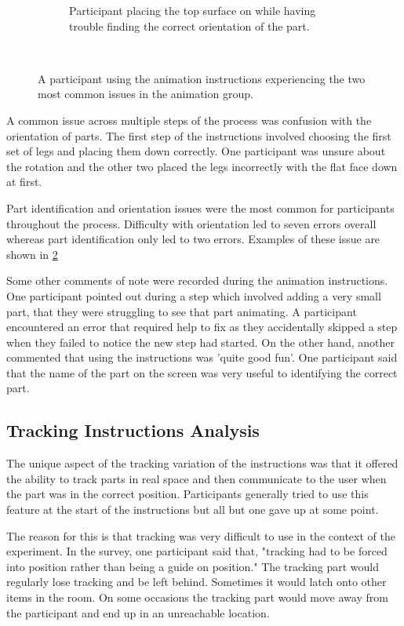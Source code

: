 \documentclass{l4proj}
\begin{document}
\begin{figure}[hbt!]
\begin{subfigure}[b]{0.45\textwidth}
        \caption{Participant placing the top surface on while having trouble finding the correct orientation of the part.}
        \label{fig:expTop}
    \end{subfigure}
    ~ %
    \caption{A participant using the animation instructions experiencing the two most common issues in the animation group.}
    \label{fig:expAnim}
\end{figure}

A common issue across multiple steps of the process was confusion with the orientation of parts. The first step of the instructions involved choosing the first set of legs and placing them down correctly. One participant was unsure about the rotation and the other two placed the legs incorrectly with the flat face down at first.

Part identification and orientation issues were the most common for participants throughout the process. Difficulty with orientation led to seven errors overall whereas part identification only led to two errors. Examples of these issue are shown in \ref{fig:expAnim}

Some other comments of note were recorded during the animation instructions. One participant pointed out during a step which involved adding a very small part, that they were struggling to see that part animating. A participant encountered an error that required help to fix as they accidentally skipped a step when they failed to notice the new step had started. On the other hand, another commented that using the instructions was 'quite good fun'. One participant said that the name of the part on the screen was very useful to identifying the correct part.

\subsection{Tracking Instructions Analysis}

The unique aspect of the tracking variation of the instructions was that it offered the ability to track parts in real space and then communicate to the user when the part was in the correct position. Participants generally tried to use this feature at the start of the instructions but all but one gave up at some point.

The reason for this is that tracking was very difficult to use in the context of the experiment. In the survey, one participant said that, "tracking had to be forced into position rather than being a guide on position." The tracking part would regularly lose tracking and be left behind. Sometimes it would latch onto other items in the room. On some occasions the tracking part would move away from the participant and end up in an unreachable location.
\end{document}
